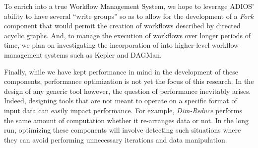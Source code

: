 To enrich \sys into a true Workflow Management
System, we hope to leverage
ADIOS' ability to have several ``write groups''
so as to allow for the development
of a {\em Fork} component
that would permit
the creation of workflows
described by directed acyclic graphs.
And, to manage the execution of workflows
over longer periods of time,
we plan on investigating
the incorporation of \sys into
higher-level workflow management systems
such as Kepler and DAGMan.

Finally, while we have kept performance in mind in the development of these
components, performance optimization is not yet the focus of this research. In
the design of any generic tool however, the question of performance inevitably
arises. Indeed, designing tools that are not meant to operate on a specific
format of input data can easily impact performance. For example, {\em
Dim-Reduce} performs the same amount of computation whether it re-arranges data
or not. In the long run, optimizing these components will involve detecting
such situations where they can avoid performing unnecessary iterations and data
manipulation.
\fi
